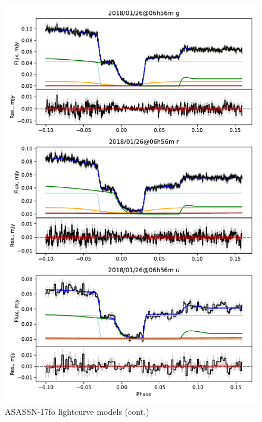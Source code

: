 \begin{figure}
    \centering
    \includegraphics[width=\textwidth]{figures/results/ASASSN-17fo/ASASSN-17fo_3.pdf}
    \caption{ASASSN-17fo lightcurve models (cont.)}
    \label{fig:ASASSN-17fo all lightcurves cont 2}
\end{figure}

